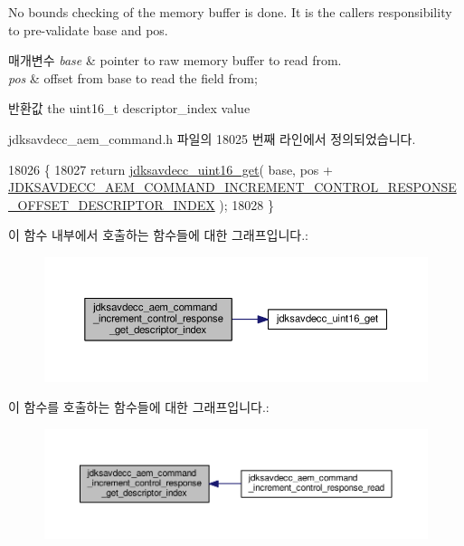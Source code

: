 No bounds checking of the memory buffer is done. It is the caller\textquotesingle{}s responsibility to pre-\/validate base and pos.


\begin{DoxyParams}{매개변수}
{\em base} & pointer to raw memory buffer to read from. \\
\hline
{\em pos} & offset from base to read the field from; \\
\hline
\end{DoxyParams}
\begin{DoxyReturn}{반환값}
the uint16\+\_\+t descriptor\+\_\+index value 
\end{DoxyReturn}


jdksavdecc\+\_\+aem\+\_\+command.\+h 파일의 18025 번째 라인에서 정의되었습니다.


\begin{DoxyCode}
18026 \{
18027     \textcolor{keywordflow}{return} \hyperlink{group__endian_ga3fbbbc20be954aa61e039872965b0dc9}{jdksavdecc\_uint16\_get}( base, pos + 
      \hyperlink{group__command__increment__control__response_gaae7ed7cd323304753f643174cb2de60c}{JDKSAVDECC\_AEM\_COMMAND\_INCREMENT\_CONTROL\_RESPONSE\_OFFSET\_DESCRIPTOR\_INDEX}
       );
18028 \}
\end{DoxyCode}


이 함수 내부에서 호출하는 함수들에 대한 그래프입니다.\+:
\nopagebreak
\begin{figure}[H]
\begin{center}
\leavevmode
\includegraphics[width=350pt]{group__command__increment__control__response_ga925d8307ee82bc9257191980d1976e95_cgraph}
\end{center}
\end{figure}




이 함수를 호출하는 함수들에 대한 그래프입니다.\+:
\nopagebreak
\begin{figure}[H]
\begin{center}
\leavevmode
\includegraphics[width=350pt]{group__command__increment__control__response_ga925d8307ee82bc9257191980d1976e95_icgraph}
\end{center}
\end{figure}



